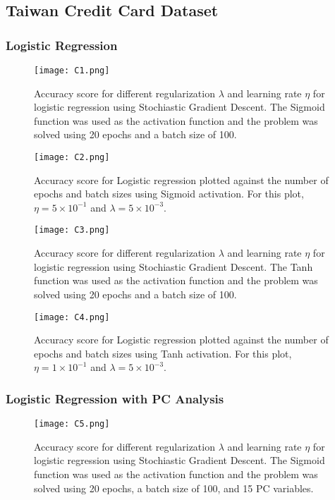 \documentclass{emulateapj}
\begin{document}
\subsection{Taiwan Credit Card Dataset}
\subsubsection{Logistic Regression}
\begin{figure}[h]
    \centering
    \texttt{[image: C1.png]}
    \caption{Accuracy score for different regularization $\lambda$ and learning rate $\eta$ for logistic regression using Stochiastic Gradient Descent. The Sigmoid function was used as the activation function and the problem was solved using 20 epochs and a batch size of 100.}
    \label{fig4}
\end{figure}
\begin{figure}[H]
    \centering
    \texttt{[image: C2.png]}
    \caption{Accuracy score for Logistic regression plotted against the number of epochs and batch sizes using Sigmoid activation. For this plot, $\eta = 5\times10^{-1}$ and $\lambda = 5\times10^{-3}$.}
    \label{fig5}
\end{figure}
\begin{figure}[H]
    \centering
    \texttt{[image: C3.png]}
    \caption{Accuracy score for different regularization $\lambda$ and learning rate $\eta$ for logistic regression using Stochiastic Gradient Descent. The Tanh function was used as the activation function and the problem was solved using 20 epochs and a batch size of 100.}
    \label{fig6}
\end{figure}

\begin{figure}[H]
    \centering
    \texttt{[image: C4.png]}
    \caption{Accuracy score for Logistic regression plotted against the number of epochs and batch sizes using Tanh activation. For this plot, $\eta = 1\times10^{-1}$ and $\lambda = 5\times10^{-3}$.}
    \label{fig7}
\end{figure}
\vfill\null
\subsubsection{Logistic Regression with PC Analysis}
\begin{figure}[H]
    \centering
    \texttt{[image: C5.png]}
    \caption{Accuracy score for different regularization $\lambda$ and learning rate $\eta$ for logistic regression using Stochiastic Gradient Descent. The Sigmoid function was used as the activation function and the problem was solved using 20 epochs, a batch size of 100, and 15 PC variables.}
    \label{fig8}
\end{figure}
\end{document}
